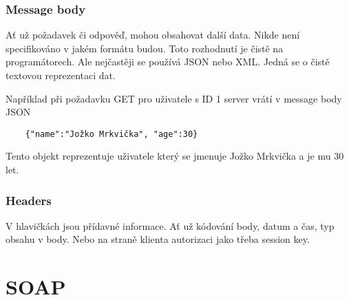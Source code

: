 \subsubsection{Message body}
Ať už požadavek či odpověď, mohou obsahovat další data. Nikde není specifikováno v jakém formátu budou. Toto rozhodnutí je čistě na programátorech. Ale nejčastěji se používá JSON nebo XML. Jedná se o čistě textovou reprezentaci dat.

Například při požadavku GET pro uživatele s ID 1 server vrátí v message body JSON
\begin{verbatim}
	{"name":"Jožko Mrkvička", "age":30}
\end{verbatim}
Tento objekt reprezentuje uživatele který se jmenuje Jožko Mrkvička a je mu 30 let.

\subsubsection{Headers}
V hlavičkách jsou přídavné informace. Ať už kódování body, datum a čas, typ obsahu v body. Nebo na straně klienta autorizaci jako třeba session key.

\section{SOAP}


\endinput